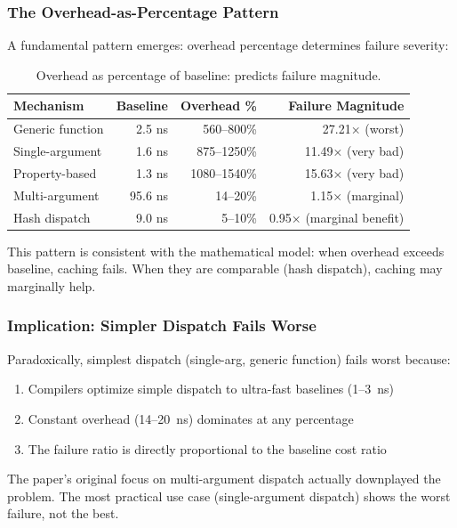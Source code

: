 \documentclass[sigplan,final]{acmart}
\begin{document}
\subsubsection{The Overhead-as-Percentage Pattern}

A fundamental pattern emerges: overhead percentage determines failure severity:

\begin{table}[h]
\centering
\caption{Overhead as percentage of baseline: predicts failure magnitude.}
\label{tab:overhead-percent}
\begin{tabular}{@{}lrrr@{}}
\toprule
\textbf{Mechanism} & \textbf{Baseline} & \textbf{Overhead \%} & \textbf{Failure Magnitude} \\
\midrule
Generic function & 2.5 ns & 560--800\% & 27.21× (worst) \\
Single-argument & 1.6 ns & 875--1250\% & 11.49× (very bad) \\
Property-based & 1.3 ns & 1080--1540\% & 15.63× (very bad) \\
Multi-argument & 95.6 ns & 14--20\% & 1.15× (marginal) \\
Hash dispatch & 9.0 ns & 5--10\% & 0.95× (marginal benefit) \\
\bottomrule
\end{tabular}
\end{table}

This pattern is consistent with the mathematical model: when overhead exceeds baseline, caching
fails. When they are comparable (hash dispatch), caching may marginally help.

\subsubsection{Implication: Simpler Dispatch Fails Worse}

Paradoxically, simplest dispatch (single-arg, generic function) fails worst because:

\begin{enumerate}
  \item Compilers optimize simple dispatch to ultra-fast baselines (1--3~ns)
  \item Constant overhead (14--20~ns) dominates at any percentage
  \item The failure ratio is directly proportional to the baseline cost ratio
\end{enumerate}

The paper's original focus on multi-argument dispatch actually downplayed the problem. The most
practical use case (single-argument dispatch) shows the worst failure, not the best.
\end{document}
